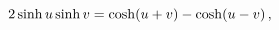\[2\mathop{\sinh\/}\nolimits u\mathop{\sinh\/}\nolimits v=\mathop{\cosh\/}%
\nolimits\!\left(u+v\right)-\mathop{\cosh\/}\nolimits\!\left(u-v\right),\]